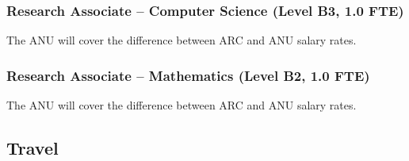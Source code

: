 \documentclass[a4paper,fontsize=12pt]{scrartcl}
\begin{document}
%
%




\subsubsection*{Research Associate – Computer Science (Level B3, 1.0 FTE)}

The ANU will cover the difference between ARC and ANU salary rates.


\subsubsection*{Research Associate – Mathematics (Level B2, 1.0 FTE)}

The ANU will cover the difference between ARC and ANU salary rates.





\subsection*{Travel}
\end{document}
